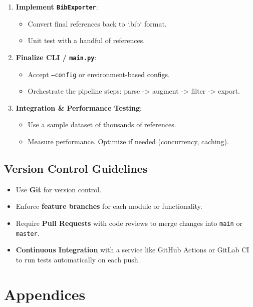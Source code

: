 \documentclass[12pt]{article}
\begin{document}
\begin{enumerate}
  \item \textbf{Implement \texttt{BibExporter}}:
    \begin{itemize}
      \item Convert final references back to `.bib` format. 
      \item Unit test with a handful of references.
    \end{itemize}

  \item \textbf{Finalize CLI / \texttt{main.py}}:
    \begin{itemize}
      \item Accept \texttt{--config} or environment-based configs.
      \item Orchestrate the pipeline steps: parse -> augment -> filter -> export.
    \end{itemize}

  \item \textbf{Integration \& Performance Testing}:
    \begin{itemize}
      \item Use a sample dataset of thousands of references. 
      \item Measure performance. Optimize if needed (concurrency, caching).
    \end{itemize}
\end{enumerate}

\subsection{Version Control Guidelines}
\begin{itemize}
  \item Use \textbf{Git} for version control. 
  \item Enforce \textbf{feature branches} for each module or functionality. 
  \item Require \textbf{Pull Requests} with code reviews to merge changes into \texttt{main} or \texttt{master}.
  \item \textbf{Continuous Integration} with a service like GitHub Actions or GitLab CI to run tests automatically on each push.
\end{itemize}

\section{Appendices}
\end{document}
